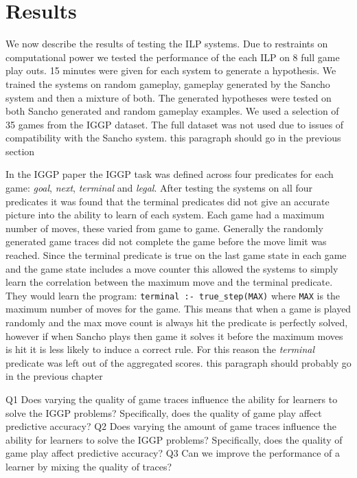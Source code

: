 \chapter{Results}\label{sec:results}
We now describe the results of testing the ILP systems. Due to restraints on computational power we tested the performance of the each ILP on 8 full game play outs. 15 minutes were given for each system to generate a hypothesis. We trained the systems on random gameplay, gameplay generated by the Sancho system and then a mixture of both. The generated hypotheses were tested on both Sancho generated and random gameplay examples. We used a selection of 35 games from the IGGP dataset\cite{Cropper/IGGP}. The full dataset was not used due to issues of compatibility with the Sancho system.
\ac{this paragraph should go in the previous section}

In the IGGP paper\cite{Cropper/IGGP} the IGGP task was defined across four predicates for each game: \textit{goal}, \textit{next}, \textit{terminal} and \textit{legal}. After testing the systems on all four predicates it was found that the terminal predicates did not give an accurate picture into the ability to learn of each system. Each game had a maximum number of moves, these varied from game to game. Generally the randomly generated game traces did not complete the game before the move limit was reached. Since the terminal predicate is true on the last game state in each game and the game state includes a move counter this allowed the systems to simply learn the correlation between the maximum move and the terminal predicate. They would learn the program: \verb|terminal :- true_step(MAX)| where \verb|MAX| is the maximum number of moves for the game. This means that when a game is played randomly and the max move count is always hit the predicate is perfectly solved, however if when Sancho plays then game it solves it before the maximum moves is hit it is less likely to induce a correct rule. For this reason the \textit{terminal} predicate was left out of the aggregated scores.
\ac{this paragraph should probably go in the previous chapter}


Q1 Does varying the quality of game traces influence the ability for learners to solve the IGGP problems? Specifically, does the quality of game play affect predictive accuracy?
Q2 Does varying the amount of game traces influence the ability for learners to solve the IGGP problems? Specifically, does the quality of game play affect predictive accuracy?
Q3 Can we improve the performance of a learner by mixing the quality of traces?

